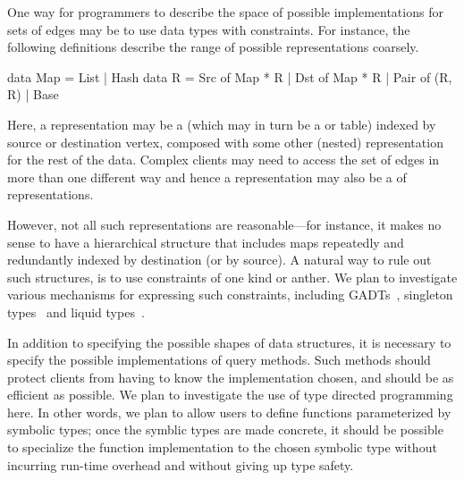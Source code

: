 One way for programmers to describe the space of possible
implementations for sets of edges may be to use data types with
constraints.  For instance, the following definitions describe the
range of possible representations  coarsely.

\begin{mylisting}
data Map = List | Hash
data R = Src of Map * R | Dst of Map * R | Pair of (R, R) | Base
\end{mylisting}

Here, a representation  may be a  (which may in turn
be a  or  table) indexed by source
or destination vertex, composed with some other (nested) representation
for the rest of the data.  Complex clients may need to access the set of
edges in more than one different way and hence a representation may also
be a  of representations.

However, not all such representations are reasonable---for instance,
it makes no sense to have a hierarchical structure that includes
maps repeatedly and redundantly indexed by destination (or by source).
A natural way to rule out such structures, is to use constraints of
one kind or anther.  We plan to investigate various mechanisms for
expressing such constraints, including GADTs~\cite{gadts},
singleton types~\cite{weirich:singletons} and 
liquid types~\cite{liquid-haskell}.

In addition to specifying the possible shapes of data structures,
it is necessary to specify the possible implementations of query
methods.  Such methods should protect clients from having to know
the implementation chosen, and should be as efficient as possible.
We plan to investigate the use of type directed programming here.
In other words, we plan to allow users to define functions parameterized
by symbolic types; once the symblic types are made concrete, it should
be possible to specialize the function implementation to the chosen
symbolic type without incurring run-time overhead and without giving up
type safety. 







